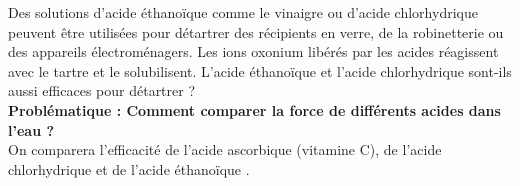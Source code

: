\documentclass[a4paper,11pt,fleqn]{article}%
\begin{document}
\maketitle

Des solutions d’acide éthanoïque comme le vinaigre ou d’acide chlorhydrique peuvent être utilisées pour détartrer des récipients en verre, de la robinetterie ou des appareils électroménagers. Les ions oxonium  libérés par les acides réagissent avec le tartre et le solubilisent. L’acide éthanoïque et l’acide chlorhydrique sont-ils aussi efficaces pour détartrer ? \\
\textbf{Problématique : Comment comparer la force de différents acides dans l’eau ?}\\
On comparera l’efficacité de l’acide ascorbique  (vitamine C), de l’acide chlorhydrique  et de l’acide éthanoïque . 

\noindent
{}
\noindent
{}
\end{document}

